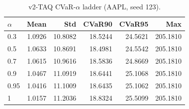 \begin{table}[H]
    \centering
    \caption{v2-TAQ CVaR-$\alpha$ ladder (AAPL, seed 123).}
    \label{tab:v2_taq_alpha}
    \begin{tabular}{@{}lrrrrr@{}}
        \toprule
        $\alpha$ & Mean & Std & CVaR90 & CVaR95 & Max \\
        \midrule
        0.3 & 1.0926 & 10.8082 & 18.5244 & 24.5621 & 205.1810 \\
        0.5 & 1.0633 & 10.8691 & 18.4981 & 24.5542 & 205.1810 \\
        0.7 & 1.0615 & 10.9616 & 18.5836 & 24.8669 & 205.1810 \\
        0.9 & 1.0467 & 11.0919 & 18.6441 & 25.1068 & 205.1810 \\
        0.95 & 1.0416 & 11.1009 & 18.6435 & 25.1062 & 205.1810 \\
        1 & 1.0157 & 11.2036 & 18.8324 & 25.5099 & 205.1810 \\
        \bottomrule
    \end{tabular}
\end{table}

